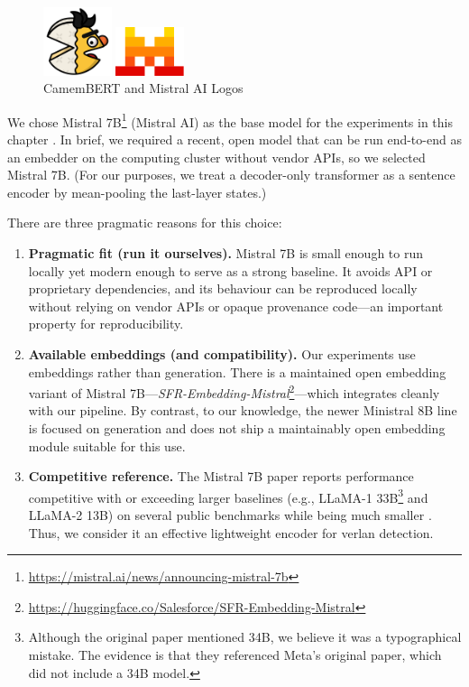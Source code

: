 \documentclass[12pt]{article}
\begin{document}
\begin{figure}[htbp]
  \centering
  \begin{minipage}{0.45\linewidth}
    \centering
    \includegraphics[width=2cm]{figures/CamemBERT.png}
  \end{minipage}%
  \hfill
  \begin{minipage}{0.45\linewidth}
    \centering
    \includegraphics[width=2cm]{figures/mistral-logo.png}
  \end{minipage}
  \caption*{\small CamemBERT and Mistral AI Logos}
\end{figure}

We chose Mistral 7B\footnote{\url{https://mistral.ai/news/announcing-mistral-7b}} (Mistral AI) as the base model for the experiments in this chapter \cite{jiang2023mistral7b}. In brief, we required a recent, open model that can be run end-to-end as an embedder on the computing cluster without vendor APIs, so we selected Mistral 7B. (For our purposes, we treat a decoder-only transformer as a sentence encoder by mean-pooling the last-layer states.)

There are three pragmatic reasons for this choice:
\begin{enumerate}
\item \textbf{Pragmatic fit (run it ourselves).} Mistral 7B is small enough to run locally yet modern enough to serve as a strong baseline. It avoids API or proprietary dependencies, and its behaviour can be reproduced locally without relying on vendor APIs or opaque provenance code\;---\;an important property for reproducibility.
\item \textbf{Available embeddings (and compatibility).} Our experiments use embeddings rather than generation. There is a maintained open embedding variant of Mistral 7B\;---\;\emph{SFR-Embedding-Mistral}\footnote{\url{https://huggingface.co/Salesforce/SFR-Embedding-Mistral}}\;---\;which integrates cleanly with our pipeline. By contrast, to our knowledge, the newer Ministral 8B line is focused on generation and does not ship a maintainably open embedding module suitable for this use.
\item \textbf{Competitive reference.} The Mistral 7B paper reports performance competitive with or exceeding larger baselines (e.g., LLaMA-1 33B\footnote{Although the original paper mentioned 34B, we believe it was a typographical mistake. The evidence is that they referenced Meta's original paper, which did not include a 34B model.} and LLaMA-2 13B) on several public benchmarks while being much smaller \cite{jiang2023mistral7b,touvron2023llama,touvron2023llama2}. Thus, we consider it an effective lightweight encoder for verlan detection.
\end{enumerate}
\end{document}
